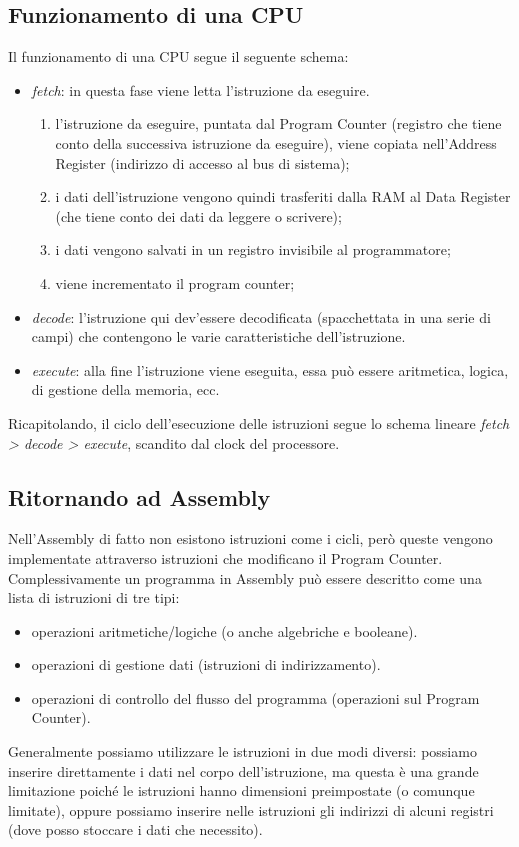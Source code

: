 \documentclass[class=book, crop=false, oneside]{standalone}
\begin{document}
\subsection{Funzionamento di una CPU}\label{subsec:cpu}
Il funzionamento di una CPU segue il seguente schema:
\begin{itemize}[noitemsep]
	\item \emph{fetch}: in questa fase viene letta l'istruzione da eseguire.
	\begin{enumerate}
		\item l'istruzione da eseguire, puntata dal Program Counter (registro che tiene conto della successiva istruzione da eseguire), viene copiata nell'Address Register (indirizzo di accesso al bus di sistema);
		\item i dati dell'istruzione vengono quindi trasferiti dalla RAM al Data Register (che tiene conto dei dati da leggere o scrivere);
		\item i dati vengono salvati in un registro invisibile al programmatore;
		\item viene incrementato il program counter;
	\end{enumerate}
	\item \emph{decode}: l’istruzione qui dev’essere decodificata (spacchettata in una serie di campi) che contengono le varie caratteristiche dell’istruzione.
	\item \emph{execute}: alla fine l’istruzione viene eseguita, essa può essere aritmetica, logica, di gestione della memoria, ecc.
\end{itemize}
Ricapitolando, il ciclo dell’esecuzione delle istruzioni segue lo schema lineare \emph{fetch > decode > execute}, scandito dal clock del processore.

\subsection*{Ritornando ad Assembly}
Nell’Assembly di fatto non esistono istruzioni come i cicli, però queste vengono implementate attraverso istruzioni che modificano il Program Counter.
Complessivamente un programma in Assembly può essere descritto come una lista di istruzioni di tre tipi:
\begin{itemize}[noitemsep]
	\item operazioni aritmetiche/logiche (o anche algebriche e booleane).
	\item operazioni di gestione dati (istruzioni di indirizzamento).
	\item operazioni di controllo del flusso del programma (operazioni sul Program Counter).
\end{itemize}
Generalmente possiamo utilizzare le istruzioni in due modi diversi: possiamo inserire direttamente i dati nel corpo dell'istruzione, ma questa è una grande limitazione poiché le istruzioni hanno dimensioni preimpostate (o comunque limitate), oppure possiamo inserire nelle istruzioni gli indirizzi di alcuni registri (dove posso stoccare i dati che necessito).
\end{document}
